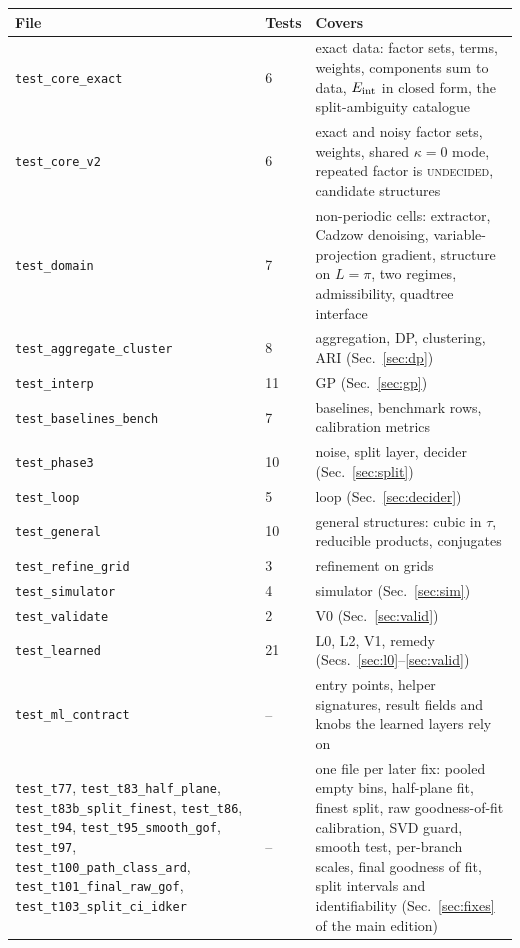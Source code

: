 \begin{table}[!htb]
\centering\small
\begin{tabular}{@{}L{4.4cm}L{1.2cm}L{6.6cm}@{}}
\toprule
File & Tests & Covers\\\midrule
\texttt{test\_core\_exact} & 6 & exact data: factor sets, terms, weights, components sum to data, $E_{\mathrm{int}}$ in closed form, the split-ambiguity catalogue\\
\texttt{test\_core\_v2} & 6 & exact and noisy factor sets, weights, shared $\kappa=0$ mode, repeated factor is \textsc{undecided}, candidate structures\\
\texttt{test\_domain} & 7 & non-periodic cells: extractor, Cadzow denoising, variable-projection gradient, structure on $L=\pi$, two regimes, admissibility, quadtree interface\\
\texttt{test\_aggregate\_cluster} & 8 & aggregation, DP, clustering, ARI (Sec.~\ref{sec:dp})\\
\texttt{test\_interp} & 11 & GP (Sec.~\ref{sec:gp})\\
\texttt{test\_baselines\_bench} & 7 & baselines, benchmark rows, calibration metrics\\
\texttt{test\_phase3} & 10 & noise, split layer, decider (Sec.~\ref{sec:split})\\
\texttt{test\_loop} & 5 & loop (Sec.~\ref{sec:decider})\\
\texttt{test\_general} & 10 & general structures: cubic in $\tau$, reducible products, conjugates\\
\texttt{test\_refine\_grid} & 3 & refinement on grids\\
\texttt{test\_simulator} & 4 & simulator (Sec.~\ref{sec:sim})\\
\texttt{test\_validate} & 2 & V0 (Sec.~\ref{sec:valid})\\
\texttt{test\_learned} & 21 & L0, L2, V1, remedy (Secs.~\ref{sec:l0}--\ref{sec:valid})\\
\texttt{test\_ml\_contract} & -- & entry points, helper signatures, result fields and knobs the learned layers rely on\\
\texttt{test\_t77}, \texttt{test\_t83\_half\_plane}, \texttt{test\_t83b\_split\_finest}, \texttt{test\_t86}, \texttt{test\_t94}, \texttt{test\_t95\_smooth\_gof}, \texttt{test\_t97}, \texttt{test\_t100\_path\_class\_ard}, \texttt{test\_t101\_final\_raw\_gof}, \texttt{test\_t103\_split\_ci\_idker} & -- & one file per later fix: pooled empty bins, half-plane fit, finest split, raw goodness-of-fit calibration, SVD guard, smooth test, per-branch scales, final goodness of fit, split intervals and identifiability (Sec.~\ref{sec:fixes} of the main edition)\\

\end{tabular}
\end{table}
